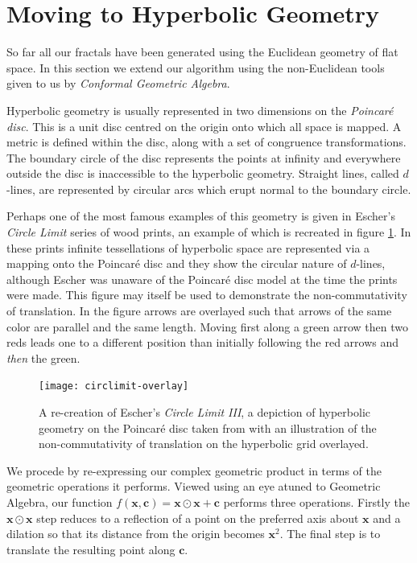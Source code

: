 \documentclass{elsart}
\theoremstyle{definition}
\newcommand{\complexprod}{\odot}
\begin{document}
\section{Moving to Hyperbolic Geometry}

So far all our fractals have been generated using the Euclidean geometry of
flat space. In this section we extend our algorithm using the non-Euclidean
tools given to us by \emph{Conformal Geometric
Algebra}\cite{wareham:iwmm,GA:llw,anthonyChina}. 

Hyperbolic geometry is usually represented in two dimensions on the
\emph{Poincar\'e disc}. This is a unit disc centred on the origin
onto which all space is mapped. A metric is defined within the
disc\cite{brannan}, along with a set of congruence transformations.
The boundary circle of the disc represents the points at infinity and everywhere
outside the disc is inaccessible to the hyperbolic geometry. Straight lines,
called $d$-lines\cite{brannan}, are represented by circular arcs which
erupt normal to the boundary circle. 

Perhaps one of the most famous examples of this geometry is given in Escher's
\emph{Circle Limit} series of wood prints, an example of which is recreated in
figure \ref{fig:circlelimit}. In these prints infinite tessellations of
hyperbolic space are represented via a mapping onto the Poincar\'e disc and
they show the circular nature of $d$-lines, although Escher was unaware of the
Poincar\'e disc model at the time the prints were made. This figure may
itself be used to demonstrate the non-commutativity of translation. In the
figure arrows are overlayed such that arrows of the same color are
parallel and the same length. Moving first along a green arrow then two
reds leads one to a different position than initially following the red 
arrows and \emph{then} the green.

\begin{figure}
\centering
\texttt{[image: circlimit-overlay]} \\
\caption{\label{fig:circlelimit}
A re-creation of Escher's \emph{Circle Limit III}, 
a depiction of hyperbolic geometry on the Poincar\'e disc
taken from \cite{transhyp} with
an illustration of the non-commutativity of translation on the
hyperbolic grid overlayed.
}
\end{figure}

We procede by re-expressing
our complex geometric product in terms of the geometric operations it performs.
Viewed using an eye atuned to Geometric Algebra, our function $f(\mathbf{x},
\mathbf{c}) = \mathbf{x}\complexprod\mathbf{x} + \mathbf{c}$ performs three
operations.  Firstly the $\mathbf{x}\complexprod\mathbf{x}$ step reduces to a
reflection of a point on the preferred axis about $\mathbf{x}$ and a dilation
so that its distance from the origin becomes $\mathbf{x}^2$. The final step is
to translate the resulting point along $\mathbf{c}$.
\end{document}
